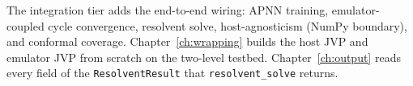 The integration tier adds the end-to-end wiring: APNN training, emulator-coupled
cycle convergence, resolvent solve, host-agnosticism (NumPy boundary), and
conformal coverage.
Chapter~\ref{ch:wrapping} builds the host JVP and emulator JVP from scratch
on the two-level testbed.
Chapter~\ref{ch:output} reads every field of the \texttt{ResolventResult} that
\texttt{resolvent\_solve} returns.
